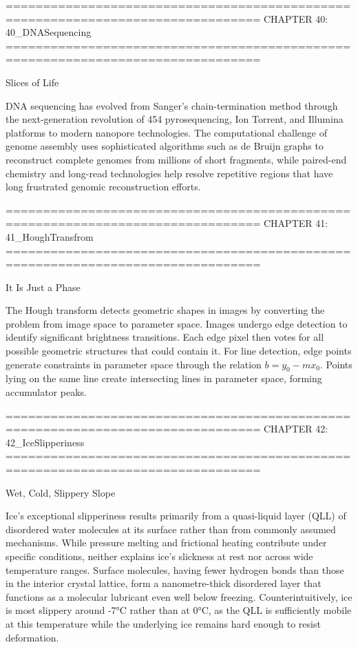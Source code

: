 ================================================================================
CHAPTER 40: 40_DNASequencing
================================================================================

Slices of Life

DNA sequencing has evolved from Sanger's chain-termination method through the next-generation revolution of 454 pyrosequencing, Ion Torrent, and Illumina platforms to modern nanopore technologies. The computational challenge of genome assembly uses sophisticated algorithms such as de Bruijn graphs to reconstruct complete genomes from millions of short fragments, while paired-end chemistry and long-read technologies help resolve repetitive regions that have long frustrated genomic reconstruction efforts.


================================================================================
CHAPTER 41: 41_HoughTransfrom
================================================================================

It Is Just a Phase

The Hough transform detects geometric shapes in images by converting the problem from image space to parameter space. Images undergo edge detection to identify significant brightness transitions. Each edge pixel then \QSOpen{}votes\QSClose{} for all possible geometric structures that could contain it. For line detection, edge points generate constraints in parameter space through the relation $b = y_0 - mx_0$. Points lying on the same line create intersecting lines in parameter space, forming accumulator peaks.


================================================================================
CHAPTER 42: 42_IceSlipperiness
================================================================================

Wet, Cold, Slippery Slope

Ice's exceptional slipperiness results primarily from a quasi-liquid layer (QLL) of disordered water molecules at its surface rather than from commonly assumed mechanisms. While pressure melting and frictional heating contribute under specific conditions, neither explains ice's slickness at rest nor across wide temperature ranges. Surface molecules, having fewer hydrogen bonds than those in the interior crystal lattice, form a nanometre-thick disordered layer that functions as a molecular lubricant even well below freezing. Counterintuitively, ice is most slippery around -7°C rather than at 0°C, as the QLL is sufficiently mobile at this temperature while the underlying ice remains hard enough to resist deformation.


